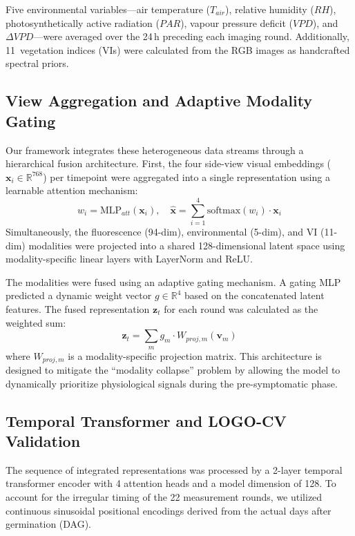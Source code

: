 \documentclass[a4paper,fleqn]{cas-dc}
\begin{document}
Five environmental variables---air temperature ($T_{air}$), relative humidity ($RH$), photosynthetically active radiation ($PAR$), vapour pressure deficit ($VPD$), and $\Delta VPD$---were averaged over the 24\,h preceding each imaging round. Additionally, 11~vegetation indices (VIs) were calculated from the RGB images as handcrafted spectral priors.

\subsection{View Aggregation and Adaptive Modality Gating}\label{sec:methods:gating}

Our framework integrates these heterogeneous data streams through a hierarchical fusion architecture. First, the four side-view visual embeddings ($\mathbf{x}_{i} \in \mathbb{R}^{768}$) per timepoint were aggregated into a single representation using a learnable attention mechanism:
\begin{equation}
    w_i = \text{MLP}_{att}(\mathbf{x}_i), \quad \hat{\mathbf{x}} = \sum_{i=1}^4 \text{softmax}(w_i) \cdot \mathbf{x}_i
\end{equation}
Simultaneously, the fluorescence (94-dim), environmental (5-dim), and VI (11-dim) modalities were projected into a shared 128-dimensional latent space using modality-specific linear layers with LayerNorm and ReLU.

The modalities were fused using an adaptive gating mechanism. A gating MLP predicted a dynamic weight vector $g \in \mathbb{R}^4$ based on the concatenated latent features. The fused representation $\mathbf{z}_t$ for each round was calculated as the weighted sum:
\begin{equation}
    \mathbf{z}_t = \sum_{m} g_m \cdot W_{proj,m}(\mathbf{v}_m)
\end{equation}
where $W_{proj,m}$ is a modality-specific projection matrix. This architecture is designed to mitigate the ``modality collapse'' problem by allowing the model to dynamically prioritize physiological signals during the pre-symptomatic phase.

\subsection{Temporal Transformer and LOGO-CV Validation}\label{sec:methods:transformer}

The sequence of integrated representations was processed by a 2-layer temporal transformer encoder with 4 attention heads and a model dimension of 128. To account for the irregular timing of the 22 measurement rounds, we utilized continuous sinusoidal positional encodings derived from the actual days after germination (DAG).
\end{document}

